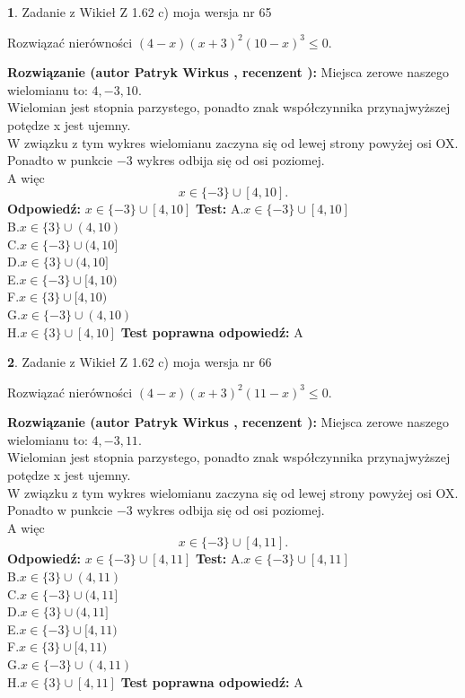 \documentclass[12pt, a4paper]{article}
\theoremstyle{definition} %
\newtheorem{zad}{}
\newcommand{\zadStart}[1]{\begin{zad}#1\newline}
\newcommand{\zadStop}{\end{zad}}
\newcommand{\rozwStart}[2]{\noindent \textbf{Rozwiązanie (autor #1 , recenzent #2): }\newline}
\newcommand{\rozwStop}{\newline}
\newcommand{\odpStart}{\noindent \textbf{Odpowiedź:}\newline}
\newcommand{\odpStop}{\newline}
\newcommand{\testStart}{\noindent \textbf{Test:}\newline}
\newcommand{\testStop}{\newline}
\newcommand{\kluczStart}{\noindent \textbf{Test poprawna odpowiedź:}\newline}
\newcommand{\kluczStop}{\newline}
\begin{document}
\zadStart{Zadanie z Wikieł Z 1.62 c) moja wersja nr 65}

Rozwiązać nierówności $(4-x)(x+3)^{2}(10-x)^{3}\le0$.
\zadStop
\rozwStart{Patryk Wirkus}{}
Miejsca zerowe naszego wielomianu to: $4, -3, 10$.\\
Wielomian jest stopnia parzystego, ponadto znak współczynnika przy\linebreak najwyższej potędze x jest ujemny.\\ W związku z tym wykres wielomianu zaczyna się od lewej strony powyżej osi OX.\\
Ponadto w punkcie $-3$ wykres odbija się od osi poziomej.\\
A więc $$x \in \{-3\} \cup [4,10].$$
\rozwStop
\odpStart
$x \in \{-3\} \cup [4,10]$
\odpStop
\testStart
A.$x \in \{-3\} \cup [4,10]$\\
B.$x \in \{3\} \cup (4,10)$\\
C.$x \in \{-3\} \cup (4,10]$\\
D.$x \in \{3\} \cup (4,10]$\\
E.$x \in \{-3\} \cup [4,10)$\\
F.$x \in \{3\} \cup [4,10)$\\
G.$x \in \{-3\} \cup (4,10)$\\
H.$x \in \{3\} \cup [4,10]$
\testStop
\kluczStart
A
\kluczStop



\zadStart{Zadanie z Wikieł Z 1.62 c) moja wersja nr 66}

Rozwiązać nierówności $(4-x)(x+3)^{2}(11-x)^{3}\le0$.
\zadStop
\rozwStart{Patryk Wirkus}{}
Miejsca zerowe naszego wielomianu to: $4, -3, 11$.\\
Wielomian jest stopnia parzystego, ponadto znak współczynnika przy\linebreak najwyższej potędze x jest ujemny.\\ W związku z tym wykres wielomianu zaczyna się od lewej strony powyżej osi OX.\\
Ponadto w punkcie $-3$ wykres odbija się od osi poziomej.\\
A więc $$x \in \{-3\} \cup [4,11].$$
\rozwStop
\odpStart
$x \in \{-3\} \cup [4,11]$
\odpStop
\testStart
A.$x \in \{-3\} \cup [4,11]$\\
B.$x \in \{3\} \cup (4,11)$\\
C.$x \in \{-3\} \cup (4,11]$\\
D.$x \in \{3\} \cup (4,11]$\\
E.$x \in \{-3\} \cup [4,11)$\\
F.$x \in \{3\} \cup [4,11)$\\
G.$x \in \{-3\} \cup (4,11)$\\
H.$x \in \{3\} \cup [4,11]$
\testStop
\kluczStart
A
\kluczStop
\end{document}
